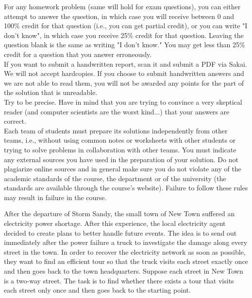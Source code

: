 \documentclass{article}
\begin{document}
 For any homework problem (same will hold
for exam questions), you can either attempt to answer the question, in
which case you will receive between 0 and 100\% credit for that
question (i.e., you can get partial credit), or you can write "I don't
know", in which case you receive 25\% credit for that question.
Leaving the question blank is the same as writing "I don't know." You
may get less than 25\% credit for a question that you answer
erroneously.\\

 If you want to submit a
handwritten report, scan it and submit a PDF via Sakai. We will not
accept hardcopies. If you choose to submit handwritten answers and we
are not able to read them, you will not be awarded any points for the
part of the solution that is unreadable.\\

 Try to be precise. Have in mind that you
are trying to convince a very skeptical reader (and computer
scientists are the worst kind...) that your answers are correct.\\

 Each team of students
must prepare its solutions independently from other teams, i.e.,
without using common notes or worksheets with other students or trying
to solve problems in collaboration with other teams.  You must
indicate any external sources you have used in the preparation of your
solution. Do not plagiarize online sources and in general make sure
you do not violate any of the academic standards of the course, the
department or of the university (the standards are available through
the course's website). Failure to follow these rules may result in
failure in the course.\\

\newpage

\vspace{0.1in}

{\bf }

 After the departure of Storm
Sandy, the small town of New Town suffered an electricity power
shortage. After this experience, the local electricity agent decided
to create plans to better handle future events. The idea is to send
out immediately after the power failure a truck to investigate the
damage along every street in the town. In order to recover the
electricity network as soon as possible, they want to find an
efficient tour so that the truck visits each street exactly once and
then goes back to the town headquarters. Suppose each street in New
Town is a two-way street. The task is to find whether there exists a
tour that visits each street only once and then goes back to the
starting point.\\
\end{document}
